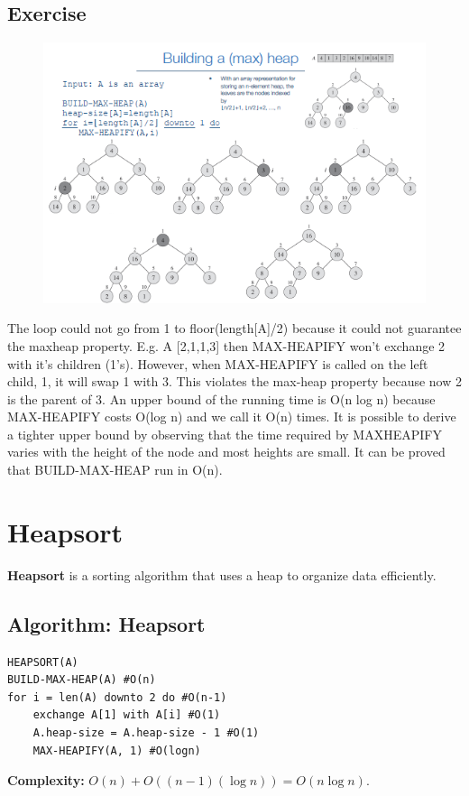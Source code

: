 \subsection{Exercise}
    \begin{figure}[h!]
        \centering
        \includegraphics[width=1\linewidth]{immagini/heap4.png}
    \end{figure}
The loop could not go from 1 to floor(length[A]/2) because it could not guarantee the maxheap property. E.g. A [2,1,1,3] then MAX-HEAPIFY won’t exchange 2 with it’s children (1’s). However, when MAX-HEAPIFY is called on the left child, 1, it will swap 1 with 3. This violates the max-heap property because now 2 is the parent of 3. An upper bound of the running time is O(n log n) because MAX-HEAPIFY costs O(log n) and we call it O(n) times. It is possible to derive a tighter upper bound by observing that the time required by MAXHEAPIFY varies with the height of the node and most heights are small. It can be proved that BUILD-MAX-HEAP run in O(n).
    
\section{Heapsort}
\textbf{Heapsort} is a sorting algorithm that uses a heap to organize data efficiently.

\subsection{Algorithm: Heapsort}
\begin{verbatim}
HEAPSORT(A)
BUILD-MAX-HEAP(A) #O(n)
for i = len(A) downto 2 do #O(n-1)
    exchange A[1] with A[i] #O(1)
    A.heap-size = A.heap-size - 1 #O(1)
    MAX-HEAPIFY(A, 1) #O(logn)
\end{verbatim}
\textbf{Complexity:} \( O(n) + O((n-1)(\log n)) = O(n \log n) \).

